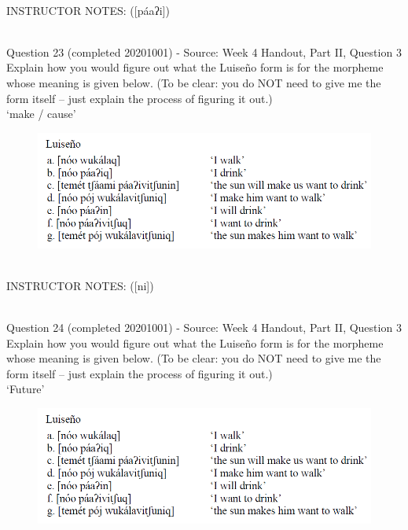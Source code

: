 \documentclass[12pt]{article}
\begin{document}
~\\
INSTRUCTOR NOTES: ([páaʔi])


~\\

{\large Question 23} (completed 20201001) - Source: Week 4 Handout, Part II, Question 3\\

Explain how you would figure out what the Luiseño form is for the morpheme whose meaning is given below. (To be clear: you do NOT need to give me the form itself -- just explain the process of figuring it out.)\\

‘make / cause’

\begin{figure}[H]
\includegraphics{../images/luiseno.png}
\end{figure}

~\\
INSTRUCTOR NOTES: ([ni])


~\\

{\large Question 24} (completed 20201001) - Source: Week 4 Handout, Part II, Question 3\\

Explain how you would figure out what the Luiseño form is for the morpheme whose meaning is given below. (To be clear: you do NOT need to give me the form itself -- just explain the process of figuring it out.)\\

‘Future’

\begin{figure}[H]
\includegraphics{../images/luiseno.png}
\end{figure}
\end{document}
